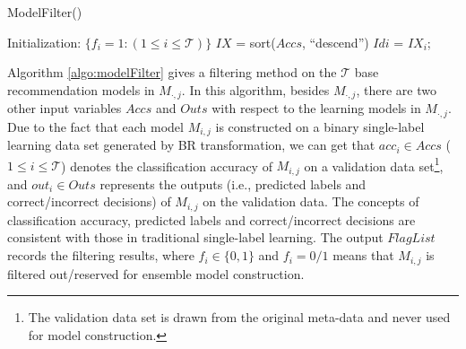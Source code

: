 \documentclass[acmsmall]{acmart}
\begin{document}
\IncMargin{0.35em} \LinesNumbered
\begin{algorithm}[!ht]
	\scriptsize
	\SetAlgoVlined
	\caption{ModelFilter()}\label{algo:modelFilter}
	\BlankLine
	\BlankLine
	Initialization: $\{f_i = 1: (1\leq i\leq \mathcal{T})\}$\;
	 {
	}
	$IX$ = sort($Accs$, ``descend'')
	 {
		$Idi$ = $IX_i$;
	}
\end{algorithm}
\DecMargin{0.35em} \LinesNumbered

Algorithm \ref{algo:modelFilter} gives a filtering method on the $\mathcal{T}$
base recommendation models in $M_{\cdot,j}$. In this algorithm,
besides $M_{\cdot,j}$, there are two other input variables $Accs$
and $Outs$ with respect to the learning models in $M_{\cdot,j}$. Due
to the fact that each model $M_{i,j}$ is constructed on a binary
single-label learning data set generated by BR transformation, we
can get that $acc_i \in Accs$ ($1\leq i \leq \mathcal{T}$) denotes the
classification accuracy of $M_{i,j}$ on a validation data
set\footnote{The validation data set is drawn from the original
	meta-data and never used for model construction.}, and $out_i \in
Outs$ represents the outputs (i.e., predicted labels and
correct/incorrect decisions) of $M_{i,j}$ on the validation data.
The concepts of classification accuracy, predicted labels and
correct/incorrect decisions are consistent with those in traditional
single-label learning. The output $FlagList$ records the filtering
results, where $f_i \in \{0,1\}$ and $f_i = 0/1$ means that
$M_{i,j}$ is filtered out/reserved for ensemble model construction.
\end{document}

